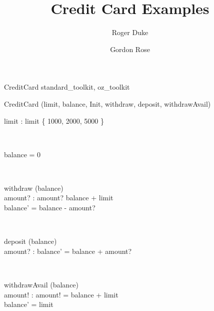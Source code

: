 


\title{Credit Card Examples}
\author{Roger Duke \and Gordon Rose}
\date{}
\maketitle

\begin{zsection}
  \SECTION CreditCard \parents standard\_toolkit, oz\_toolkit
\end{zsection}

\begin{class}{CreditCard} 
\also
        \project (limit, balance, Init, withdraw, deposit, withdrawAvail) \\
        \begin{axdef}
		limit : \nat
	\where
		limit \in \{ 1000, 2000, 5000 \}
	\end{axdef}
	 \\
	\begin{init}
		balance = 0
	\end{init} \\
	\begin{op}{withdraw}
		\Delta (balance) \\
		amount? : \nat
	\where
		amount? \leq balance + limit \\
		balance' = balance - amount?
	\end{op} \\
	\begin{op}{deposit}
		\Delta (balance) \\
		amount? : \nat
	\where
		balance' = balance + amount?
	\end{op} \\
	\begin{op}{withdrawAvail}
		\Delta (balance) \\
		amount! : \nat
	\where
		amount! = balance + limit \\
		balance' = \negate limit
	\end{op}	
\end{class}

